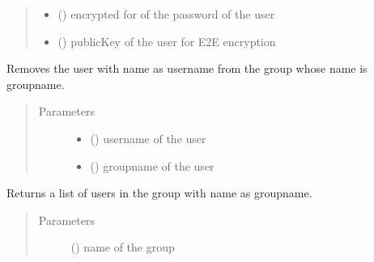 \documentclass[letterpaper,10pt,english]{sphinxmanual}
\begin{document}
\begin{fulllineitems}
\begin{fulllineitems}
\begin{quote}
\begin{description}
\begin{itemize}
\item {} 
 () \textendash{} encrypted for of the password of the user

\item {} 
 () \textendash{} publicKey of the user for E2E encryption

\end{itemize}

\end{description}\end{quote}

\end{fulllineitems}


\begin{fulllineitems}
\label{\detokenize{sql:sql.Database.delete_user_in_group}}
Removes the user with name as username from the group whose name is groupname.
\begin{quote}\begin{description}
\item[{Parameters}] \leavevmode\begin{itemize}
\item {} 
 () \textendash{} username of the user

\item {} 
 () \textendash{} groupname of the user

\end{itemize}

\end{description}\end{quote}

\end{fulllineitems}


\begin{fulllineitems}
\label{\detokenize{sql:sql.Database.get_all_users}}
Returns a list of users in the group with name as groupname.
\begin{quote}\begin{description}
\item[{Parameters}] \leavevmode
{} () \textendash{} name of the group


\end{description}
\end{quote}
\end{fulllineitems}
\end{fulllineitems}
\end{document}
